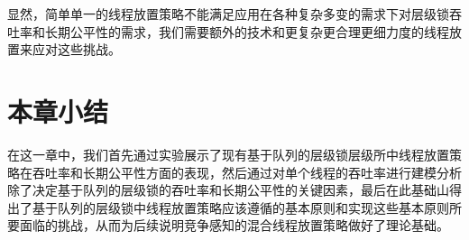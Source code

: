 显然，简单单一的线程放置策略不能满足应用在各种复杂多变的需求下对层级锁吞吐率和长期公平性的需求，我们需要额外的技术和更复杂更合理更细力度的线程放置来应对这些挑战。

\section{本章小结}
在这一章中，我们首先通过实验展示了现有基于队列的层级锁层级所中线程放置策略在吞吐率和长期公平性方面的表现，然后通过对单个线程的吞吐率进行建模分析除了决定基于队列的层级锁的吞吐率和长期公平性的关键因素，最后在此基础山得出了基于队列的层级锁中线程放置策略应该遵循的基本原则和实现这些基本原则所要面临的挑战，从而为后续说明竞争感知的混合线程放置策略做好了理论基础。
